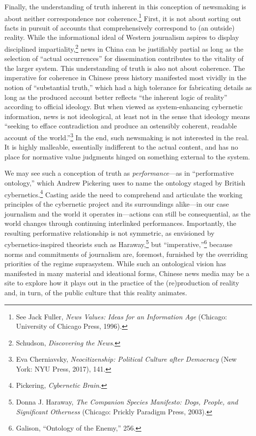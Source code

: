 \documentclass{tufte-handout}
\begin{document}
\begin{CJK*}{UTF8}{gbsn}
\begin{CJK*}{UTF8}{gbsn}
Finally, the understanding of truth inherent in this conception of
newsmaking is about neither correspondence nor coherence.\footnote{See
  Jack Fuller, \emph{News Values: Ideas for an Information Age}
  (Chicago: University of Chicago Press, 1996).} First, it is not about
sorting out facts in pursuit of accounts that comprehensively correspond
to (an outside) reality. While the informational ideal of Western
journalism aspires to display disciplined impartiality,\footnote{Schudson,
  \emph{Discovering the News}.} news in China can be justifiably partial
as long as the selection of ``actual occurrences'' for dissemination
contributes to the vitality of the larger system. This understanding of
truth is also not about coherence. The imperative for coherence in
Chinese press history manifested most vividly in the notion of
``substantial truth,'' which had a high tolerance for fabricating
details as long as the produced account better reflects ``the inherent
logic of reality'' according to official ideology. But when viewed as
system-enhancing cybernetic information, news is not ideological, at
least not in the sense that ideology means ``seeking to efface
contradiction and produce an ostensibly coherent, readable account of
the world.''\footnote{Eva Cherniavsky, \emph{Neocitizenship: Political
  Culture after Democracy} (New York: NYU Press, 2017), 141.} In the
end, such newsmaking is not interested in the real. It is highly
malleable, essentially indifferent to the actual content, and has no
place for normative value judgments hinged on something external to the
system.

We may see such a conception of truth as \emph{performance}---as in
``performative ontology,'' which Andrew Pickering uses to name the
ontology staged by British cybernetics.\footnote{Pickering,
  \emph{Cybernetic Brain}.} Casting aside the need to comprehend and
articulate the working principles of the cybernetic project and its
surroundings alike---in our case journalism and the world it operates
in---actions can still be consequential, as the world changes through
continuing interlinked performances. Importantly, the resulting
performative relationship is not symmetric, as envisioned by
cybernetics-inspired theorists such as Haraway,\footnote{Donna J.
  Haraway, \emph{The Companion Species Manifesto: Dogs, People, and
  Significant Otherness} (Chicago: Prickly Paradigm Press, 2003).} but
``imperative,''\footnote{Galison, ``Ontology of the Enemy,'' 256.}
because norms and commitments of journalism are, foremost, furnished by
the overriding priorities of the regime suprasystem. While such an
ontological vision has manifested in many material and ideational forms,
Chinese news media may be a site to explore how it plays out in the
practice of the (re)production of reality and, in turn, of the public
culture that this reality animates.


\end{CJK*}
\end{CJK*}
\end{document}
